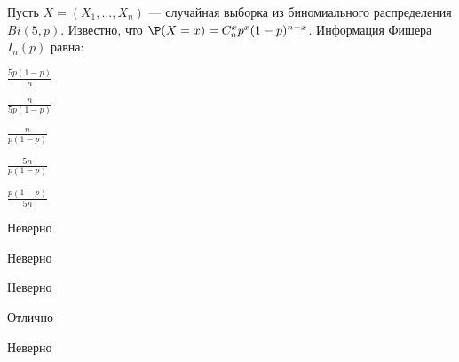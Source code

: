 
\begin{question}
Пусть \(X = (X_1, \ldots , X_n)\) --- случайная выборка из биномиального
распределения \(Bi(5, p)\). Известно, что
\(\P(X = x) =C_n^x p^x(1-p)^{n-x}\). Информация Фишера \(I_n(p)\) равна:
\begin{answerlist}
  \item \(\frac{5p(1-p)}{n}\)
  \item \(\frac{n}{5p(1-p)}\)
  \item \(\frac{n}{p(1-p)}\)
  \item \(\frac{5n}{p(1-p)}\)
  \item \(\frac{p(1-p)}{5n}\)
\end{answerlist}
\end{question}

\begin{solution}
\begin{answerlist}
  \item Неверно
  \item Неверно
  \item Неверно
  \item Отлично
  \item Неверно
\end{answerlist}
\end{solution}

